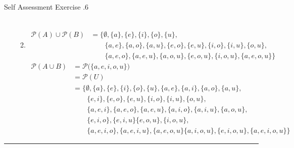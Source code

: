 \documentclass[../notes.tex]{subfiles}
\begin{document}
\begin{exercisebox}{Self Assessment Exercise \thechapter.6}
\begin{enumerate}
\begin{enumerate}[label=(\alph*)]
\begin{align*}
                \end{align*}
              \item \rule{0pt}{11pt} \vspace*{-25pt}
                \begin{align*}
                  \mathcal{P}(A) \cup \mathcal{P}(B) &= \bigl\{\emptyset, \{a\}, \{e\}, \{i\}, \{o\}, \{u\},\\
                  & \qquad \{a, e\}, \{a, o\}, \{a, u\}, \{e, o\}, \{e, u\}, \{i, o\}, \{i, u\}, \{o, u\}, \\
                  & \qquad \{a, e, o\}, \{a, e, u\}, \{a, o, u\}, \{e, o, u\}, \{i, o, u\}, \{a, e, o, u\}\bigr\}
                \end{align*}
                \begin{align*}
                  \mathcal{P}(A \cup B) &= \mathcal{P}\bigl(\{a, e, i, o, u\}\bigr)\\
                  &= \mathcal{P}(U)\\
                  &= \bigl\{\emptyset, \{a\}, \{e\}, \{i\}, \{o\}, \{u\}, \{a, e\}, \{a, i\}, \{a, o\}, \{a, u\},\\
                  & \qquad \{e, i\}, \{e, o\}, \{e, u\}, \{i, o\}, \{i, u\}, \{o, u\},\\
                  & \qquad \{a, e, i\}, \{a, e, o\}, \{a, e, u\}, \{a, i, o\}, \{a, i, u\}, \{a, o, u\},\\
                  & \qquad \{e, i, o\}, \{e, i, u\} \{e, o, u\}, \{i, o, u\},\\
                  & \qquad \{a, e, i, o\}, \{a, e, i, u\}, \{a, e, o, u\} \{a, i, o, u\}, \{e, i, o, u\}, \{a, e, i, o, u\}\bigr\}
                \end{align*}
            \end{enumerate}
        \end{enumerate}
      \end{exercisebox}
      \noindent\rule{\textwidth}{0.4pt}
\end{document}
